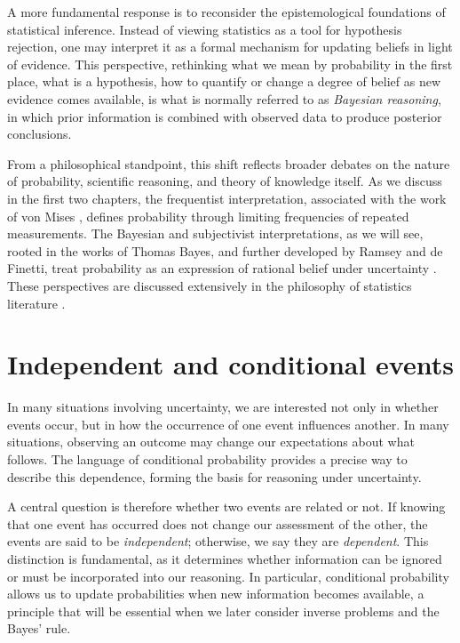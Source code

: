 A more fundamental response is to reconsider the epistemological foundations of statistical inference. Instead of viewing statistics as a tool for hypothesis rejection, one may interpret it as a formal mechanism for updating beliefs in light of evidence. This perspective, rethinking what we mean by probability in the first place, what is a hypothesis, how to quantify or change a degree of belief as new evidence comes available, is what is normally referred to as \textit{Bayesian reasoning}, in which prior information is combined with observed data to produce posterior conclusions.

\medskip

From a philosophical standpoint, this shift reflects broader debates on the nature of probability, scientific reasoning, and theory of knowledge itself. As we discuss in the first two chapters, the frequentist interpretation, associated with the work of von Mises \cite{vonmises_1928_truth}, defines probability through limiting frequencies of repeated measurements. The Bayesian and subjectivist interpretations, as we will see, rooted in the works of Thomas Bayes, and further developed by Ramsey and de Finetti, treat probability as an expression of rational belief under uncertainty \cite{ramsey_1931_foundations, definetti_1974_probability}. These perspectives are discussed extensively in the philosophy of statistics literature \cite{bandyopadhyay_2011_philosophy}.

\section{Independent and conditional events}

In many situations involving uncertainty, we are interested not only in whether events occur, but in how the occurrence of one event influences another. In many situations, observing an outcome may change our expectations about what follows. The language of conditional probability provides a precise way to describe this dependence, forming the basis for reasoning under uncertainty.

A central question is therefore whether two events are related or not. If knowing that one event has occurred does not change our assessment of the other, the events are said to be \textit{independent}; otherwise, we say they are \textit{dependent}. This distinction is fundamental, as it determines whether information can be ignored or must be incorporated into our reasoning. In particular, conditional probability allows us to update probabilities when new information becomes available, a principle that will be essential when we later consider inverse problems and the Bayes’ rule.

